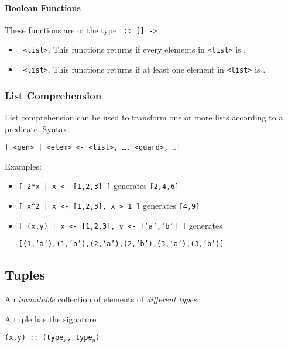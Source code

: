 \paragraph{Boolean Functions} These functions are of the type \texttt{ :: [] -> }
\begin{itemize}
  \item \texttt{ <list>}. This functions returns \texttt{} if every elements in \texttt{<list>} is \texttt{}.
  \item \texttt{ <list>}. This functions returns \texttt{} if at least one element in \texttt{<list>} is \texttt{}.
\end{itemize}

\subsubsection{List Comprehension}
List comprehension can be used to transform one or more lists according to a predicate. Syntax:
\begin{center}
  \texttt{[ <gen> | <elem> <- <list>, \ldots, <guard>, \ldots ]}
\end{center}
Examples:
\begin{itemize}
  \item \texttt{[ 2*x | x <- [1,2,3] ]} generates \texttt{[2,4,6]}
  \item \texttt{[ x\^{}2 | x <- [1,2,3], x > 1 ]} generates \texttt{[4,9]}
  \item \texttt{[ (x,y) | x <- [1,2,3], y <- [`a',`b'] ]} generates
  
  \texttt{[(1,`a'),(1,`b'),(2,`a'),(2,`b'),(3,`a'),(3,`b')]}
\end{itemize}

\subsection{Tuples}
An \textit{immutable} collection of elements of \textit{different types}.

A tuple has the signature
\begin{center}
  \texttt{(x,y) :: (type$_x$, type$_y$)}
\end{center}